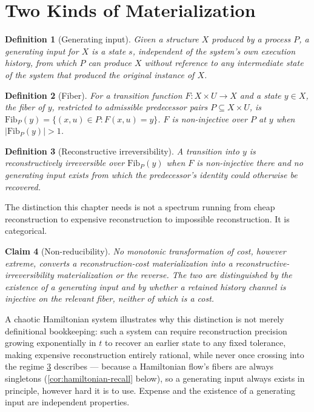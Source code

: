 \documentclass[12pt]{report}
\newtheorem{definition}{Definition}[section]
\newtheorem{claim}[definition]{Claim}
\begin{document}
\section{Two Kinds of Materialization}
\label{sec:two-kinds-recall}

\begin{definition}[Generating input]
\label{def:generating-input}
Given a structure $X$ produced by a process $P$, a generating input for
$X$ is a state $s$, independent of the system's own execution history,
from which $P$ can produce $X$ without reference to any intermediate
state of the system that produced the original instance of $X$.
\end{definition}

\begin{definition}[Fiber]
\label{def:fiber}
For a transition function $F : X \times U \to X$ and a state $y \in X$,
the fiber of $y$, restricted to admissible predecessor pairs $P
\subseteq X \times U$, is $\mathrm{Fib}_P(y) = \{(x,u) \in P : F(x,u) =
y\}$. $F$ is non-injective over $P$ at $y$ when $|\mathrm{Fib}_P(y)| > 1$.
\end{definition}

\begin{definition}[Reconstructive irreversibility]
\label{def:irreversibility}
A transition into $y$ is reconstructively irreversible over
$\mathrm{Fib}_P(y)$ when $F$ is non-injective there and no generating
input exists from which the predecessor's identity could otherwise be
recovered.
\end{definition}

The distinction this chapter needs is not a spectrum running from cheap
reconstruction to expensive reconstruction to impossible reconstruction.
It is categorical.

\begin{claim}[Non-reducibility]
\label{claim:non-reducibility}
No monotonic transformation of cost, however extreme, converts a
reconstruction-cost materialization into a reconstructive-irreversibility
materialization or the reverse. The two are distinguished by the
existence of a generating input and by whether a retained history
channel is injective on the relevant fiber, neither of which is a cost.
\end{claim}

A chaotic Hamiltonian system illustrates why this distinction is not
merely definitional bookkeeping: such a system can require reconstruction
precision growing exponentially in $t$ to recover an earlier state to any
fixed tolerance, making expensive reconstruction entirely rational, while
never once crossing into the regime \cref{def:irreversibility} describes
--- because a Hamiltonian flow's fibers are always singletons
(\cref{cor:hamiltonian-recall} below), so a generating input always
exists in principle, however hard it is to use. Expense and the existence
of a generating input are independent properties.
\end{document}
